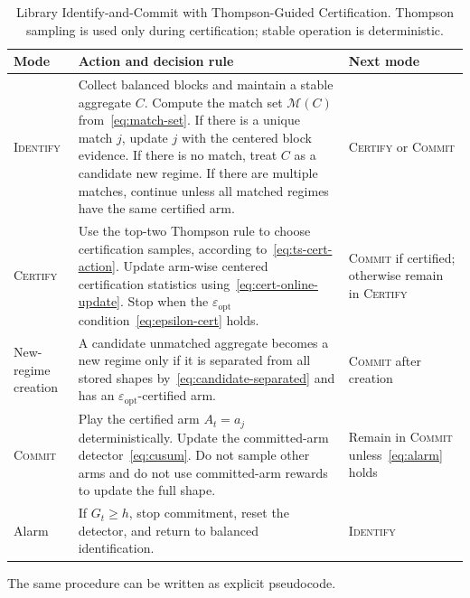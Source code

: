 \documentclass[11pt]{article}
\newcommand{\ID}{\textsc{Identify}\xspace}
\newcommand{\CERT}{\textsc{Certify}\xspace}
\newcommand{\COMMIT}{\textsc{Commit}\xspace}
\begin{document}
\begin{table}[t]
\centering
\small
\renewcommand{\arraystretch}{1.25}
\begin{tabularx}{\textwidth}{>{\raggedright\arraybackslash}p{} >{\raggedright\arraybackslash}X >{\raggedright\arraybackslash}p{}}
\toprule
\textbf{Mode} & \textbf{Action and decision rule} & \textbf{Next mode} \\
\midrule
\ID & Collect balanced blocks and maintain a stable aggregate $C$. Compute the match set $\mathcal M(C)$ from~\eqref{eq:match-set}. If there is a unique match $j$, update $j$ with the centered block evidence. If there is no match, treat $C$ as a candidate new regime. If there are multiple matches, continue unless all matched regimes have the same certified arm. & \CERT or \COMMIT \\
\midrule
\CERT & Use the top-two Thompson rule to choose certification samples, according to~\eqref{eq:ts-cert-action}. Update arm-wise centered certification statistics using~\eqref{eq:cert-online-update}. Stop when the $\varepsilon_{\mathrm{opt}}$ condition~\eqref{eq:epsilon-cert} holds. & \COMMIT if certified; otherwise remain in \CERT \\
\midrule
New-regime creation & A candidate unmatched aggregate becomes a new regime only if it is separated from all stored shapes by~\eqref{eq:candidate-separated} and has an $\varepsilon_{\mathrm{opt}}$-certified arm. & \COMMIT after creation \\
\midrule
\COMMIT & Play the certified arm $A_t=a_j$ deterministically. Update the committed-arm detector~\eqref{eq:cusum}. Do not sample other arms and do not use committed-arm rewards to update the full shape. & Remain in \COMMIT unless~\eqref{eq:alarm} holds \\
\midrule
Alarm & If $G_t\geq h$, stop commitment, reset the detector, and return to balanced identification. & \ID \\
\bottomrule
\end{tabularx}
\caption{Library Identify-and-Commit with Thompson-Guided Certification. Thompson sampling is used only during certification; stable operation is deterministic.}
\label{tab:algorithm}
\end{table}

The same procedure can be written as explicit pseudocode.
\end{document}
